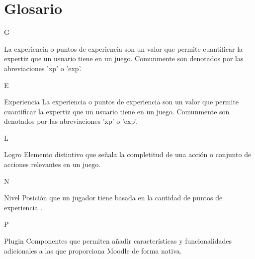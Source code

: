 \chapter{Glosario}


\newcommand{\term}[2]{\item[\hypertarget{#1}{#2}]}

\begin{glosario}{G}

    \term{tGamificacion}{Gamificación} La experiencia o puntos de experiencia son un 
    valor que permite cuantificar la expertiz que un usuario tiene en un juego. 
    Comunmente son denotados por las abreviaciones 'xp' o 'exp'.
    
\end{glosario}

\begin{glosario}{E}

    \item[Experiencia] La experiencia o puntos de experiencia son un valor que 
    permite cuantificar la expertiz que un usuario tiene en un juego. Comunmente 
    son denotados por las abreviaciones 'xp' o 'exp'.
    
\end{glosario}

\begin{glosario}{L}

    \item[Logro] Elemento distintivo que señala la completitud de una acción o conjunto de 
    acciones relevantes en un juego.
    
\end{glosario}

\begin{glosario}{N}

    \item[Nivel] Posición que un jugador tiene basada en la cantidad de puntos de 
    experiencia \cite[p. 197]{conveptosVJNiveles}.
    
\end{glosario}

\begin{glosario}{P}

    \item[Plugin] Componentes que permiten añadir características y funcionalidades adicionales a las que proporciona Moodle de forma nativa.
    
\end{glosario}











